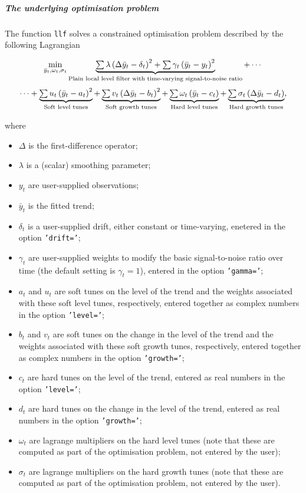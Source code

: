 \subparagraph{The underlying optimisation
problem}\label{the-underlying-optimisation-problem}

The function \texttt{llf} solves a constrained optimisation problem
described by the following Lagrangian

\[\min_{\bar y_t, \omega_t, \sigma_t}
\underbrace{
{\textstyle{\sum}\,} \lambda \left( \Delta \bar y_t - \delta_t \right)^2
+ {\textstyle{\sum}\,} \gamma_t \left( \bar y_t - y_t \right)^2}_\text{Plain local level
filter with time-varying signal-to-noise ratio} + \cdots\] \[\cdots +
\underbrace{{\textstyle{\sum}\,} u_t \left( \bar y_t - a_t \right)^2}_\text{Soft level tunes}
+ \underbrace{{\textstyle{\sum}\,} v_t \left( \Delta \bar y_t - b_t
\right)^2}_\text{Soft growth tunes} +
\underbrace{{\textstyle{\sum}\,} \omega_t \left( \bar y_t - c_t \right)}_\text{Hard level tunes}
+ \underbrace{{\textstyle{\sum}\,} \sigma_t \left( \Delta \bar y_t - d_t
\right)}_\text{Hard growth tunes},\]

where

\begin{itemize}
\itemsep1pt\parskip0pt
\item
  $\Delta$ is the first-difference operator;
\item
  $\lambda$ is a (scalar) smoothing parameter;
\item
  $y_t$ are user-supplied observations;
\item
  $\bar y_t$ is the fitted trend;
\item
  $\delta_t$ is a user-supplied drift, either constant or time-varying,
  enetered in the option \texttt{'drift='};
\item
  $\gamma_t$ are user-supplied weights to modify the basic
  signal-to-noise ratio over time (the default setting is $\gamma_t=1$),
  entered in the option \texttt{'gamma='};
\item
  $a_t$ and $u_t$ are soft tunes on the level of the trend and the
  weights associated with these soft level tunes, respectively, entered
  together as complex numbers in the option \texttt{'level='};
\item
  $b_t$ and $v_t$ are soft tunes on the change in the level of the trend
  and the weights associated with these soft growth tunes, respectively,
  entered together as complex numbers in the option \texttt{'growth='};
\item
  $c_t$ are hard tunes on the level of the trend, entered as real
  numbers in the option \texttt{'level='};
\item
  $d_t$ are hard tunes on the change in the level of the trend, entered
  as real numbers in the option \texttt{'growth='};
\item
  $\omega_t$ are lagrange multipliers on the hard level tunes (note that
  these are computed as part of the optimisation problem, not entered by
  the user);
\item
  $\sigma_t$ are lagrange multipliers on the hard growth tunes (note
  that these are computed as part of the optimisation problem, not
  entered by the user).
\end{itemize}

